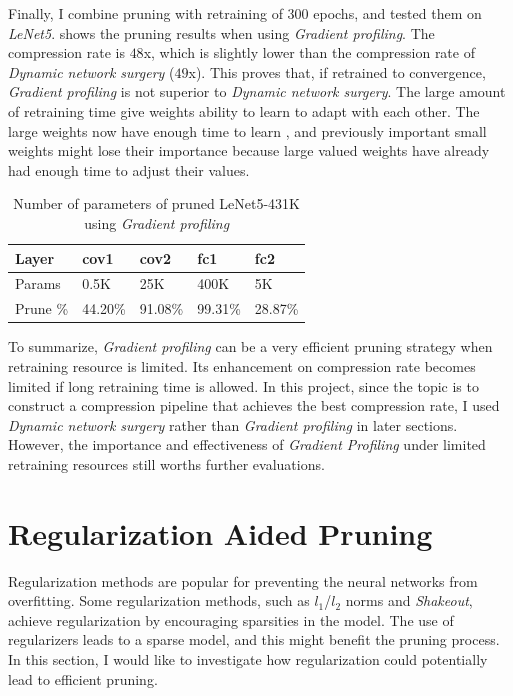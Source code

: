 \documentclass[a4paper,12pt]{report}
\begin{document}
Finally, I combine pruning with retraining of 300 epochs, and tested them
on \textit{LeNet5}.
 shows the pruning results when using \textit{Gradient profiling}.
The compression rate is $48$x, which is slightly lower than the compression rate
of \textit{Dynamic network surgery} ($49$x).
This proves that, if retrained to convergence, \textit{Gradient profiling} is not
superior to \textit{Dynamic network surgery}.
The large amount of retraining time give weights ability to learn to adapt with
each other.
The large weights now have enough time to learn , and
previously important small weights might lose their importance because large valued
weights have already had enough time to adjust their values.
\begin{table}[!h]
\centering
\begin{tabular}{|l|l|l|l|l|}
\hline
Layer			&cov1	&cov2	&fc1	&fc2 		\\ \hline
Params		& 0.5K		&25K	&400K	&5K		\\
\hline
Prune \%	&  44.20\%		&91.08\%	&99.31\%	&28.87\%	 \\
\hline
\end{tabular}
\caption{Number of parameters of pruned LeNet5-431K using \textit{Gradient profiling}}
\label{tab:LeNetPrunegp}
\end{table}

To summarize, \textit{Gradient profiling} can be a very efficient pruning strategy
when retraining resource is limited.
Its enhancement on compression rate becomes limited if long retraining time is allowed.
In this project, since the topic is to construct a compression pipeline that achieves
the best compression rate, I used \textit{Dynamic network surgery} rather than
\textit{Gradient profiling} in later sections.
However, the importance and effectiveness of \textit{Gradient Profiling} under
limited retraining resources still worths further evaluations.

\section{Regularization Aided Pruning}
Regularization methods are popular for preventing the neural networks from
overfitting.
Some regularization methods, such as $l_1$/$l_2$ norms and \textit{Shakeout},
achieve regularization by encouraging sparsities in the model.
The use of regularizers leads to a sparse model, and this might benefit the pruning
process.
In this section, I would like to investigate how regularization could potentially
lead to efficient pruning.
\end{document}

